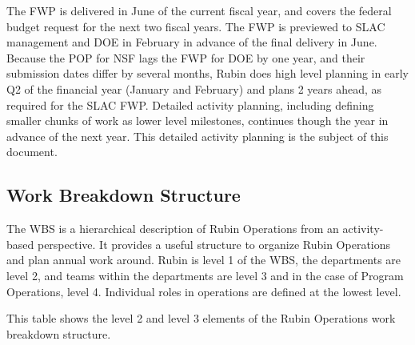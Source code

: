 The \gls{FWP} is delivered in June of the current fiscal year, and covers the federal budget request for the next two fiscal years.
The \gls{FWP} is previewed to \gls{SLAC} management and \gls{DOE} in February in advance of the final delivery in June.
Because the \gls{POP} for NSF lags the FWP for DOE by one year, and their submission dates differ by several months, Rubin does high level planning in early \gls{Q2} of the financial year (January and February) and plans 2 years ahead, as required for the \gls{SLAC} FWP.
Detailed activity planning, including defining smaller chunks of work as lower level milestones, continues though the year in advance of the next year.
This detailed activity planning is the subject of this document.

\subsection{Work Breakdown Structure}
\label{sec:wbs}

The \gls{WBS} is a hierarchical description of \gls{Rubin Operations} from an activity-based perspective.
It provides a useful structure to organize \gls{Rubin Operations} and plan annual work around.
Rubin is level 1 of the \gls{WBS}, the departments are level 2, and teams within the departments are level 3 and in the case of Program \gls{Operations}, level 4.
Individual roles in operations are defined at the lowest level.

This table shows the level 2 and level 3 elements of the \gls{Rubin Operations} work breakdown structure.



